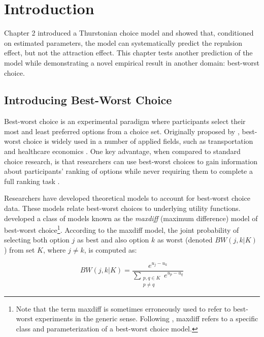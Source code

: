 \section{Introduction}

Chapter 2 introduced a Thurstonian choice model and showed that, conditioned on estimated parameters, the model can systematically predict the repulsion effect, but not the attraction effect. This chapter tests another prediction of the model while demonstrating a novel empirical result in another domain: best-worst choice.

\subsection{Introducing Best-Worst Choice}

Best-worst choice is an experimental paradigm where participants select their most and least preferred options from a choice set. Originally proposed by \textcite{finn1992determining}, best-worst choice is widely used in a number of applied fields, such as transportation \parencite{beck2016best} and healthcare economics \parencite{cheung2016using,flynn2007best,muhlbacher2016experimental}. One key advantage, when compared to standard choice research, is that researchers can use best-worst choices to gain information about participants' ranking of options while never requiring them to complete a full ranking task \parencite{flynn2014best}.

Researchers have developed theoretical models to account for best-worst choice data. These models relate best-worst choices to underlying utility functions. \textcite{marleyProbabilisticModelsBest2005} developed a class of models known as the \textit{maxdiff} (maximum difference) model of best-worst choice\footnote{Note that the term maxdiff is sometimes erroneously used to refer to best-worst experiments in the generic sense. Following \textcite{marleyProbabilisticModelsBest2005}, maxdiff refers to a specific class and parameterization of a best-worst choice model.}. According to the maxdiff model, the joint probability of selecting both option $j$ as best and also option $k$ as worst (denoted $BW(j,k|K)$ ) from set $K$, where $j \neq k$, is computed as:

\begin{equation}
   BW(j,k|K)=\frac{e^{u_{j}-u_{k}}}{\sum_{\substack{{p,q}\in K\\p \neq q}} e^{u_{p}-u_{q}}}   
   \label{eqn:maxdiff_equation_joint}
\end{equation}

